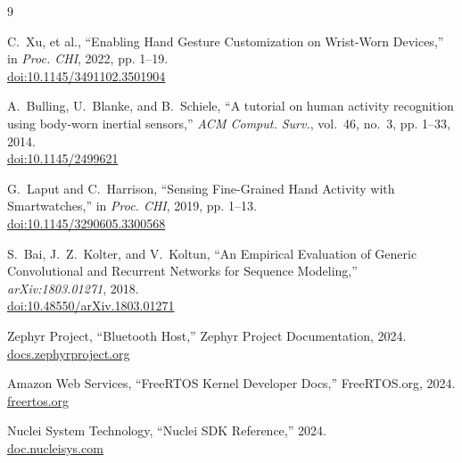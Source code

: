 \documentclass[lettersize,journal]{IEEEtran}
\begin{document}
\begin{thebibliography}{9}

C.~Xu, et al., ``Enabling Hand Gesture Customization on Wrist-Worn Devices,'' in \textit{Proc. CHI}, 2022, pp. 1--19.
\\\href{https://doi.org/10.1145/3491102.3501904}{doi:10.1145/3491102.3501904}

A.~Bulling, U.~Blanke, and B.~Schiele, ``A tutorial on human activity recognition using body-worn inertial sensors,'' \textit{ACM Comput. Surv.}, vol.~46, no.~3, pp. 1--33, 2014.
\\\href{https://doi.org/10.1145/2499621}{doi:10.1145/2499621}

G.~Laput and C.~Harrison, ``Sensing Fine-Grained Hand Activity with Smartwatches,'' in \textit{Proc. CHI}, 2019, pp. 1--13.
\\\href{https://doi.org/10.1145/3290605.3300568}{doi:10.1145/3290605.3300568}

S.~Bai, J.~Z.~Kolter, and V.~Koltun, ``An Empirical Evaluation of Generic Convolutional and Recurrent Networks for Sequence Modeling,'' \textit{arXiv:1803.01271}, 2018.
\\\href{https://doi.org/10.48550/arXiv.1803.01271}{doi:10.48550/arXiv.1803.01271}

Zephyr Project, ``Bluetooth Host,'' Zephyr Project Documentation, 2024.
\\\href{https://docs.zephyrproject.org/latest/connectivity/bluetooth/index.html}{docs.zephyrproject.org}

Amazon Web Services, ``FreeRTOS Kernel Developer Docs,'' FreeRTOS.org, 2024.
\\\href{https://www.freertos.org/Documentation/}{freertos.org}

Nuclei System Technology, ``Nuclei SDK Reference,'' 2024.
\\\href{https://doc.nucleisys.com/nuclei_sdk/}{doc.nucleisys.com}

\end{thebibliography}

\vfill
\end{document}
